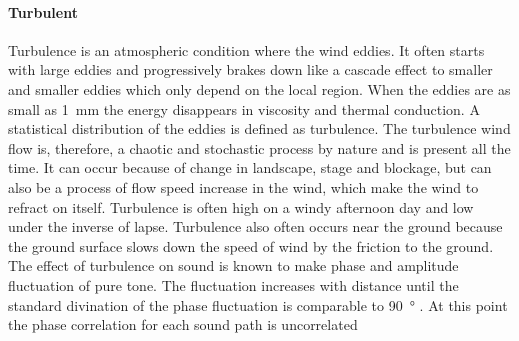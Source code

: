 \paragraph{Turbulent} Turbulence is an atmospheric condition where the wind eddies. It often starts with large eddies and progressively brakes down like a cascade effect to smaller and smaller eddies which only depend on the local region. When the eddies are as small as \SI{1}{\milli\meter} the energy disappears in viscosity and thermal conduction. A statistical distribution of the eddies is defined as turbulence. The turbulence wind flow is, therefore, a chaotic and stochastic process by nature and is present all the time. It can occur because of change in landscape, stage and blockage, but can also be a process of flow speed increase in the wind, which make the wind to refract on itself. Turbulence is often high on a windy afternoon day and low under the inverse of lapse. Turbulence also often occurs near the ground because the ground surface slows down the speed of wind by the friction to the ground. The effect of turbulence on sound is known to make phase and amplitude fluctuation of pure tone. The fluctuation increases with distance until the standard divination of the phase fluctuation is comparable to \SI{90}{\degree} \citep{review_of_sound}. At this point the phase correlation for each sound path is uncorrelated









